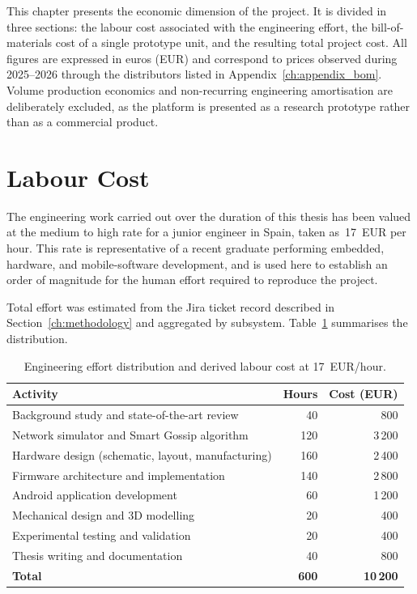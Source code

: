 \documentclass[english,bachelor]{tfgitic}[2026/01/22]
\begin{document}
This chapter presents the economic dimension of the project. It is divided in three sections: the labour cost associated with the engineering effort, the bill-of-materials cost of a single prototype unit, and the resulting total project cost. All figures are expressed in euros (EUR) and correspond to prices observed during 2025--2026 through the distributors listed in Appendix~\ref{ch:appendix_bom}. Volume production economics and non-recurring engineering amortisation are deliberately excluded, as the platform is presented as a research prototype rather than as a commercial product.

\section{Labour Cost}
\label{sec:cost_labour}

The engineering work carried out over the duration of this thesis has been valued at the medium to high rate for a junior engineer in Spain, taken as~17~EUR per hour. This rate is representative of a recent graduate performing embedded, hardware, and mobile-software development, and is used here to establish an order of magnitude for the human effort required to reproduce the project.

Total effort was estimated from the Jira ticket record described in Section~\ref{ch:methodology} and aggregated by subsystem. Table~\ref{tab:cost_hours} summarises the distribution.

\begin{table}[htbp]
    \centering
    \caption{Engineering effort distribution and derived labour cost at 17~EUR/hour.}
    \label{tab:cost_hours}
    \begin{tabular}{lrr}
        \toprule
        \textbf{Activity} & \textbf{Hours} & \textbf{Cost (EUR)} \\
        \midrule
        Background study and state-of-the-art review & 40 & 800 \\
        Network simulator and Smart Gossip algorithm & 120 & 3\,200 \\
        Hardware design (schematic, layout, manufacturing) & 160 & 2\,400 \\
        Firmware architecture and implementation & 140 & 2\,800 \\
        Android application development & 60 & 1\,200 \\
        Mechanical design and 3D modelling & 20 & 400 \\
        Experimental testing and validation & 20 & 400 \\
        Thesis writing and documentation & 40 & 800 \\
        \midrule
        \textbf{Total} & \textbf{600} & \textbf{10\,200} \\
        \bottomrule
    \end{tabular}
\end{table}
\end{document}
